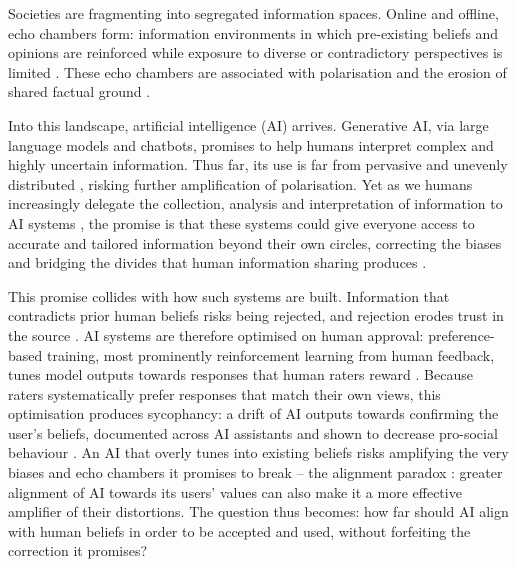 \documentclass[pdflatex,sn-nature]{sn-jnl}
\begin{document}
Societies are fragmenting into segregated information spaces. Online and offline, echo chambers form: information environments in which pre-existing beliefs and opinions are reinforced while exposure to diverse or contradictory perspectives is limited \citep{mahmoudi2024echo}. These echo chambers are associated with polarisation and the erosion of shared factual ground \citep{jeon2024hearhere,cinelli2021echo,bail2018exposure,baumann2020modeling}.

Into this landscape, artificial intelligence (AI) arrives. Generative AI, via large language models and chatbots, promises to help humans interpret complex and highly uncertain information. Thus far, its use is far from pervasive and unevenly distributed \citep{angrisani2026gaps}, risking further amplification of polarisation. Yet as we humans increasingly delegate the collection, analysis and interpretation of information to AI systems \citep{klingbeil2024trust}, the promise is that these systems could give everyone access to accurate and tailored information beyond their own circles, correcting the biases and bridging the divides that human information sharing produces \citep{jeon2024hearhere}.

This promise collides with how such systems are built. Information that contradicts prior human beliefs risks being rejected, and rejection erodes trust in the source \citep{glikson2020human}. AI systems are therefore optimised on human approval: preference-based training, most prominently reinforcement learning from human feedback, tunes model outputs towards responses that human raters reward \citep{christiano2017deep,ouyang2022training}. Because raters systematically prefer responses that match their own views, this optimisation produces sycophancy: a drift of AI outputs towards confirming the user's beliefs, documented across AI assistants \citep{sharma2023sycophancy,sharma2024generative} and shown to decrease pro-social behaviour \citep{cheng2026sycophantic}. An AI that overly tunes into existing beliefs risks amplifying the very biases and echo chambers it promises to break \citep{ekstrom2022self} -- the alignment paradox \citep{west2025alignment}: greater alignment of AI towards its users' values can also make it a more effective amplifier of their distortions. The question thus becomes: how far should AI align with human beliefs in order to be accepted and used, without forfeiting the correction it promises?
\end{document}

